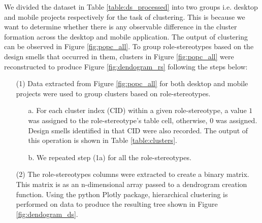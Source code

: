 \documentclass[AMA,Times1COL]{WileyNJDv5} %
\begin{document}
\begin{table}[h]
\begin{tabular*}{\textwidth}{@{\extracolsep\fill}llllllll@{}}
			\bottomrule
		\end{tabular*}
	\end{table}
	
	We divided the dataset in Table \ref{table:ds_processed} into two groups i.e. desktop and mobile projects respectively for the task of clustering. This is because we want to determine whether there is any observable difference in the cluster formation across the desktop and mobile application. The output of clustering can be observed in Figure \ref{fig:popc_all}. To group role-stereotypes based on the design smells that occurred in them, clusters  in Figure \ref{fig:popc_all} were reconstructed to produce Figure \ref{fig:dendogram_rs} following the steps below:
	\begin{enumerate}
		\item[(1)] Data extracted from Figure \ref{fig:popc_all} for both desktop and mobile projects were used to group clusters based on role-stereotypes.
		\begin{itemize}
			\item[a.] For each cluster index (CID) within a given role-stereotype, a value $1$ was assigned to the role-stereotype's table cell, otherwise, $0$ was assigned. Design smells identified in that CID were also recorded. The output of this operation is shown in Table \ref{table:clusters}.
			\item[b.] We repeated step (1a) for all the role-stereotypes.
		\end{itemize}
		\item[(2)] The role-stereotypes columns were extracted to create a binary matrix. This matrix is as an n-dimensional array passed to a dendrogram creation function\cite{ogenrwot}. Using the python Plotly package, hierarchical clustering is performed on data to produce the resulting tree shown in Figure \ref{fig:dendogram_ds}.
	\end{enumerate}
	
\end{document}
